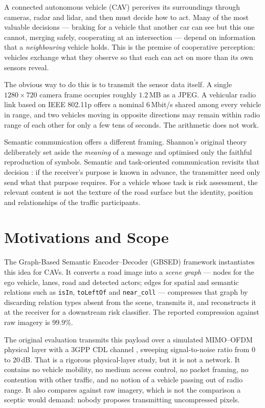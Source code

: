 \documentclass{iutbscthesis}
\begin{document}
A connected autonomous vehicle (CAV) perceives its surroundings through
cameras, radar and lidar, and then must decide how to act. Many of the most
valuable decisions --- braking for a vehicle that another car can see but this
one cannot, merging safely, cooperating at an intersection --- depend on
information that a \emph{neighbouring} vehicle holds. This is the premise of
cooperative perception: vehicles exchange what they observe so that each can
act on more than its own sensors reveal.

The obvious way to do this is to transmit the sensor data itself. A single
$1280 \times 720$ camera frame occupies roughly $1.2$\,MB as a JPEG. A vehicular
radio link based on IEEE 802.11p \cite{ieee80211p} offers a nominal $6$\,Mbit/s
shared among every vehicle in range, and two vehicles moving in opposite
directions may remain within radio range of each other for only a few tens of
seconds. The arithmetic does not work.

Semantic communication offers a different framing. Shannon's original theory
\cite{shannon1948mathematical} deliberately set aside the \emph{meaning} of a
message and optimised only the faithful reproduction of symbols. Semantic and
task-oriented communication revisits that decision
\cite{gunduz2023beyond, xie2021deep}: if the receiver's purpose is known in
advance, the transmitter need only send what that purpose requires. For a
vehicle whose task is risk assessment, the relevant content is not the texture
of the road surface but the identity, position and relationships of the
traffic participants.

\section{Motivations and Scope}

The Graph-Based Semantic Encoder--Decoder (GBSED) framework
\cite{ribouh2026graph} instantiates this idea for CAVs. It converts a road
image into a \emph{scene graph} --- nodes for the ego vehicle, lanes, road and
detected actors; edges for spatial and semantic relations such as
\texttt{isIn}, \texttt{toLeftOf} and \texttt{near\_coll} --- compresses that
graph by discarding relation types absent from the scene, transmits it, and
reconstructs it at the receiver for a downstream risk classifier. The reported
compression against raw imagery is $99.9\%$.

The original evaluation transmits this payload over a simulated MIMO--OFDM
physical layer with a 3GPP CDL channel \cite{tr38901}, sweeping
signal-to-noise ratio from $0$ to $20$\,dB. That is a rigorous physical-layer
study, but it is not a network. It contains no vehicle mobility, no medium
access control, no packet framing, no contention with other traffic, and no
notion of a vehicle passing out of radio range. It also compares against raw
imagery, which is not the comparison a sceptic would demand: nobody proposes
transmitting uncompressed pixels.
\end{document}

